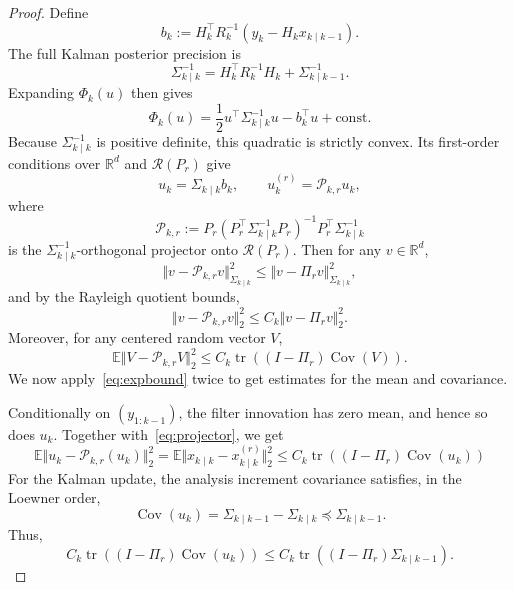 \documentclass[a4paper,12pt]{article}
\begin{document}
\begin{proof}
Define
\begin{equation}
    b_k := H_k^\top R_k^{-1}(y_k - H_k x_{k\mid k-1}).
\end{equation}
The full Kalman posterior precision is
\begin{equation}
\Sigma_{k \mid k}^{-1} = H_{k}^{\top} R_{k}^{-1} H_k + \Sigma_{k \mid k-1}^{-1}.
\end{equation}
Expanding $\Phi_k(u)$ then gives
\begin{equation}
    \Phi_k(u)=\frac{1}{2} u^\top \Sigma_{k\mid k}^{-1} u - b_k^\top u + \mathrm{const.}
\end{equation}
Because $\Sigma_{k\mid k}^{-1}$ is positive definite, this quadratic is strictly convex.
Its first-order conditions over $\mathbb{R}^d$ and $\mathcal{R}(P_r)$ give
\begin{equation}\label{eq:projector}
    u_k = \Sigma_{k\mid k} b_k, \qquad u_{k}^{(r)} = \mathcal{P}_{k,r} u_k,
\end{equation}
where
\begin{equation}
    \mathcal{P}_{k,r} := P_r
    (P_{r}^{\top} \Sigma_{k\mid k}^{-1} P_r)^{-1}
    P_{r}^{\top} \Sigma_{k\mid k}^{-1}
\end{equation}
is the $\Sigma_{k\mid k}^{-1}$-orthogonal projector onto $\mathcal{R}(P_r)$.
Then for any $v \in \mathbb{R}^d$,
\begin{equation}
    \Vert v - \mathcal{P}_{k,r}v \Vert_{\Sigma_{k \mid k}}^{2}
    \leq \Vert v - \Pi_r v \Vert_{\Sigma_{k \mid k}}^{2},
\end{equation}
and by the Rayleigh quotient bounds,
\begin{equation}
    \Vert v - \mathcal{P}_{k,r}v \Vert_{2}^{2}
    \leq C_k \Vert v - \Pi_r v \Vert_{2}^{2}.
\end{equation}
Moreover, for any centered random vector $V$,
\begin{equation}\label{eq:expbound}
    \mathbb{E}\Vert V - \mathcal{P}_{k,r}V \Vert_{2}^{2}
    \leq C_k \operatorname{tr}((I - \Pi_r)\operatorname{Cov}(V)).
\end{equation}
We now apply~\eqref{eq:expbound} twice to get estimates for the mean and covariance.

Conditionally on $(y_{1:k-1})$, the filter innovation has zero mean, and hence so does $u_k$.
Together with~\eqref{eq:projector}, we get
\begin{equation}
    \mathbb{E} \Vert u_k - \mathcal{P}_{k,r}(u_k) \Vert_{2}^{2}
    = \mathbb{E} \Vert x_{k \mid k} - x_{k \mid k}^{(r)} \Vert_{2}^{2}
    \leq C_k \operatorname{tr}((I - \Pi_r) \operatorname{Cov}(u_k))
\end{equation}
For the Kalman update, the analysis increment covariance satisfies, in the Loewner order,
\begin{equation}
    \operatorname{Cov}(u_k) = \Sigma_{k \mid k-1}-\Sigma_{k \mid k} \preceq \Sigma_{k \mid k-1}.
\end{equation}
Thus,
\begin{equation}
    C_k \operatorname{tr}((I - \Pi_r) \operatorname{Cov}(u_k))
    \leq C_k \operatorname{tr}((I - \Pi_r) \Sigma_{k \mid k-1}).\label{eq:trbound1}
\end{equation}


\end{proof}
\end{document}
